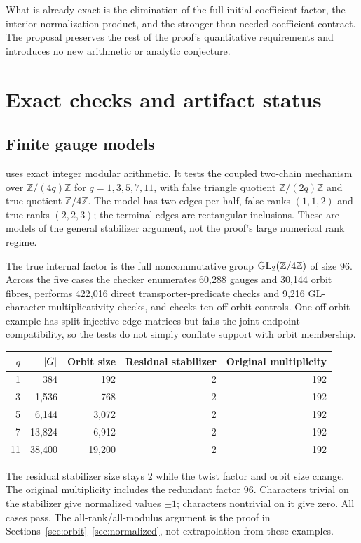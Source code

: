What is already exact is the elimination of the full initial coefficient factor, the interior normalization product, and the stronger-than-needed coefficient contract. The proposal preserves the rest of the proof's quantitative requirements and introduces no new arithmetic or analytic conjecture.

\section{Exact checks and artifact status}
\label{sec:checks}

\subsection{Finite gauge models}

 uses exact integer modular arithmetic. It tests the coupled two-chain mechanism over $\mathbb Z/(4q)\mathbb Z$ for $q=1,3,5,7,11$, with false triangle quotient $\mathbb Z/(2q)\mathbb Z$ and true quotient $\mathbb Z/4\mathbb Z$. The model has two edges per half, false ranks $(1,1,2)$ and true ranks $(2,2,3)$; the terminal edges are rectangular inclusions. These are models of the general stabilizer argument, not the proof's large numerical rank regime.

The true internal factor is the full noncommutative group $\operatorname{GL}_2(\mathbb Z/4\mathbb Z)$ of size $96$. Across the five cases the checker enumerates 60,288 gauges and 30,144 orbit fibres, performs 422,016 direct transporter-predicate checks and 9,216 GL-character multiplicativity checks, and checks ten off-orbit controls. One off-orbit example has split-injective edge matrices but fails the joint endpoint compatibility, so the tests do not simply conflate support with orbit membership.

\begin{center}
\begin{tabular}{@{}rrrrr@{}}
\toprule
$q$ & $\lvert G\rvert$ & Orbit size & Residual stabilizer & Original multiplicity\\
\midrule
1 & 384 & 192 & 2 & 192\\
3 & 1,536 & 768 & 2 & 192\\
5 & 6,144 & 3,072 & 2 & 192\\
7 & 13,824 & 6,912 & 2 & 192\\
11 & 38,400 & 19,200 & 2 & 192\\
\bottomrule
\end{tabular}
\end{center}
The residual stabilizer size stays $2$ while the twist factor and orbit size change. The original multiplicity includes the redundant factor $96$. Characters trivial on the stabilizer give normalized values $\pm1$; characters nontrivial on it give zero. All cases pass. The all-rank/all-modulus argument is the proof in Sections~\ref{sec:orbit}--\ref{sec:normalized}, not extrapolation from these examples.

